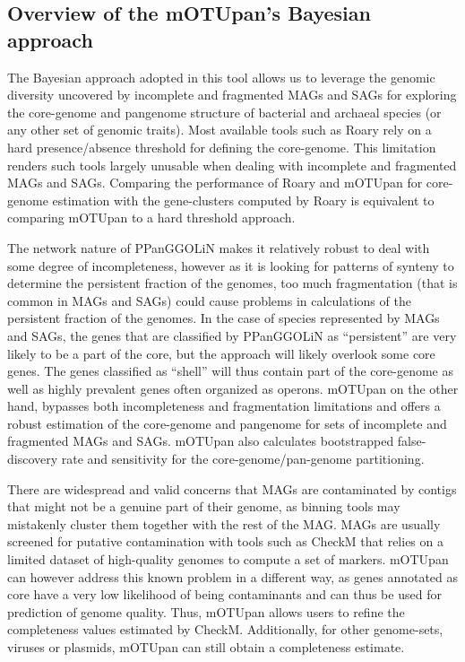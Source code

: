 \documentclass{article}
\begin{document}
\subsection*{Overview of the mOTUpan’s Bayesian approach}
The Bayesian approach adopted in this tool allows us to leverage the genomic diversity uncovered by incomplete and fragmented MAGs and SAGs for exploring the core-genome and pangenome structure of bacterial and archaeal species (or any other set of genomic traits). Most available tools such as Roary rely on a hard presence/absence threshold for defining the core-genome. This limitation renders such tools largely unusable when dealing with incomplete and fragmented MAGs and SAGs. Comparing the performance of Roary and mOTUpan for core-genome estimation with the gene-clusters computed by Roary is equivalent to comparing mOTUpan to a hard threshold approach.

The network nature of PPanGGOLiN makes it relatively robust to deal with some degree of incompleteness, however as it is looking for patterns of synteny to determine the persistent fraction of the genomes, too much fragmentation (that is common in MAGs and SAGs) could cause problems in calculations of the persistent fraction of the genomes. In the case of species represented by MAGs and SAGs, the genes that are classified by PPanGGOLiN as ``persistent'' are very likely to be a part of the core, but the approach will likely overlook some core genes. The genes classified as ``shell'' will thus contain part of the core-genome as well as highly prevalent genes often organized as operons. mOTUpan on the other hand, bypasses both incompleteness and fragmentation limitations and offers a robust estimation of the core-genome and pangenome for sets of incomplete and fragmented MAGs and SAGs. mOTUpan also calculates bootstrapped false-discovery rate and sensitivity for the core-genome/pan-genome partitioning.

There are widespread and valid concerns that MAGs are contaminated by contigs that might not be a genuine part of their genome, as binning tools may mistakenly cluster them together with the rest of the MAG. MAGs are usually screened for putative contamination with tools such as CheckM that relies on a limited dataset of high-quality genomes to compute a set of markers. mOTUpan can however address this known problem in a different way, as genes annotated as core have a very low likelihood of being contaminants and can thus be used for prediction of genome quality. Thus, mOTUpan allows users to refine the completeness values estimated by CheckM. Additionally, for other genome-sets, viruses or plasmids, mOTUpan can still obtain a completeness estimate.
\end{document}
